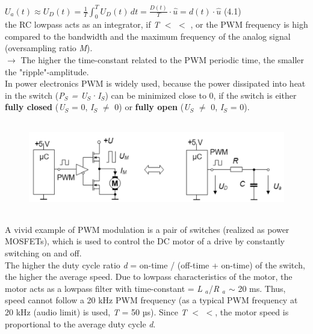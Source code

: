  $U_{a} (t)\approx U_{D} (t)=\frac{1}{T} \int _{0}^{T}U_{D} (t)\, dt =\frac{D(t)}{T} \cdot \hat{u}=d(t)\cdot \hat{u}$  (4.1) \\

the RC lowpass acts as an integrator, if \textit{T} $\mathrm{<}$ $\mathrm{<}$ , or the PWM frequency is high compared to the bandwidth and the maximum frequency of the analog signal (oversampling ratio \textit{M}). \\

$\rightarrow$ The higher the time-constant related to the PWM periodic time, the smaller the "ripple"-amplitude.\\

In power electronics PWM is widely used, because the power dissipated into heat in the switch (\textit{P${}_{S}$ = U${}_{S}$}·\textit{I${}_{S}$}) can be minimized close to 0, if the switch is either \textbf{fully closed} (\textit{U${}_{S}$} = 0, \textit{I${}_{S}$} $\mathrm{\neq}$ 0) or \textbf{fully open} (\textit{U${}_{S}$} $\mathrm{\neq}$ 0, \textit{I${}_{S}$}  = 0).

    \begin{figure}[h]
    \centering
    \includegraphics[width=14cm, height=4cm]{Images/image171.png}
    \label{fig:Fig }
    \end{figure}

A vivid example of PWM modulation is a pair of switches (realized as power MOSFETs), which is used to control the DC motor of a drive by constantly switching on and off.\\

The higher the duty cycle ratio \textit{d} = on-time / (off-time + on-time) of the switch, the higher the average speed. Due to lowpass characteristics of the motor, the motor acts as a lowpass filter with time-constant  = \textit{L ${}_{a}$}/\textit{R ${}_{a}$} $\mathrm{\sim}$ 20 ms. Thus, speed cannot follow a 20 kHz PWM frequency (as a typical PWM frequency at 20 kHz (audio limit) is used,  \textit{T} = 50 µs). Since \textit{T} $\mathrm{<}$ $\mathrm{<}$, the motor speed is proportional to the average duty cycle \textit{d}. \\

